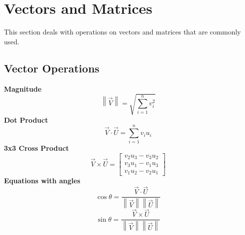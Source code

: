 \section{Vectors and Matrices}
This section deals with operations on vectors and matrices that are commonly used.
\subsection{Vector Operations}
	\textbf{Magnitude}
	\begin{equation}
	\left\|   \vec{V} \right\|  = \sqrt{\sum_{i=1}^{n} v_i^2}
	\end{equation}
	\textbf{Dot Product}
	\begin{equation}
	\vec{V} \cdot \vec{U} = \sum_{i=1}^{n} v_iu_i
	\end{equation}
	\textbf{3x3 Cross Product}
\begin{equation}
	\vec{V} \times \vec{U} = \begin{bmatrix}
		v_2u_3 - v_3u_2\\ 
		v_3u_1 - v_1u_3\\ 
		v_1u_2 - v_2u_1
	\end{bmatrix}
\end{equation}
	\textbf{Equations with angles}
		\begin{equation}
		\cos{\theta} = \frac{\vec{V} \cdot \vec{U}}{\left\| \vec{V} \right\| \left\| \vec{U} \right\| }
		\end{equation}
		\begin{equation}
		\sin{\theta} = \frac{\vec{V} \times \vec{U}}{\left\| \vec{V} \right\| \left\| \vec{U} \right\| }
		\end{equation}
